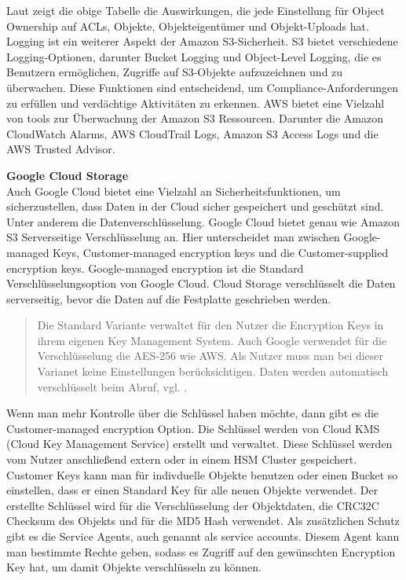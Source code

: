 Laut \citeauthor{aws-iam-s3} zeigt die obige Tabelle die Auswirkungen, die jede Einstellung für Object Ownership auf ACLs, Objekte, Objekteigentümer und Objekt-Uploads hat.\\

Logging ist ein weiterer Aspekt der Amazon S3-Sicherheit. S3 bietet verschiedene Logging-Optionen, darunter Bucket Logging und Object-Level Logging, die es Benutzern ermöglichen, Zugriffe auf S3-Objekte aufzuzeichnen und zu überwachen. Diese Funktionen sind entscheidend, um Compliance-Anforderungen zu erfüllen und verdächtige Aktivitäten zu erkennen. AWS bietet eine Vielzahl von tools zur Überwachung der Amazon S3 Ressourcen. Darunter die Amazon CloudWatch Alarms, AWS CloudTrail Logs, Amazon S3 Access Logs und die AWS Trusted Advisor.\\


\newpage

\textbf{Google Cloud Storage}\\

Auch Google Cloud bietet eine Vielzahl an Sicherheitsfunktionen, um sicherzustellen, dass Daten in der Cloud sicher gespeichert und geschützt sind. Unter anderem die Datenverschlüsselung. Google Cloud bietet genau wie Amazon S3 Serverseitige Verschlüsselung an. Hier unterscheidet man zwischen Google-managed Keys, Customer-managed encryption keys und die Customer-supplied encryption keys. Google-managed encryption ist die Standard Verschlüsselungsoption von Google Cloud. Cloud Storage verschlüsselt die Daten serverseitig, bevor die Daten auf die Festplatte geschrieben werden. 

\begin{quote}
	Die Standard Variante verwaltet für den Nutzer die Encryption Keys in ihrem eigenen Key Management System. Auch Google verwendet für die Verschlüsselung die AES-256 wie AWS. Als Nutzer muss man bei dieser Varianet keine Einstellungen berücksichtigen. Daten werden automatisch verschlüsselt beim Abruf, vgl. \cite{gcp-encrypt}.
\end{quote}

Wenn man mehr Kontrolle über die Schlüssel haben möchte, dann gibt es die Customer-managed encryption Option. Die Schlüssel werden von Cloud KMS (Cloud Key Management Service) erstellt und verwaltet. Diese Schlüssel werden vom Nutzer anschließend extern oder in einem HSM Cluster gespeichert. Customer Keys kann man für indivduelle Objekte benutzen oder einen Bucket so einstellen, dass er einen Standard Key für alle neuen Objekte verwendet. Der erstellte Schlüssel wird für die Verschlüsselung der Objektdaten, die CRC32C Checksum des Objekts und für die MD5 Hash verwendet. Als zusätzlichen Schutz gibt es die Service Agents, auch genannt als service accounts. Diesem Agent kann man bestimmte Rechte geben, sodass es Zugriff auf den gewünschten Encryption Key hat, um damit Objekte verschlüsseln zu können.\\


